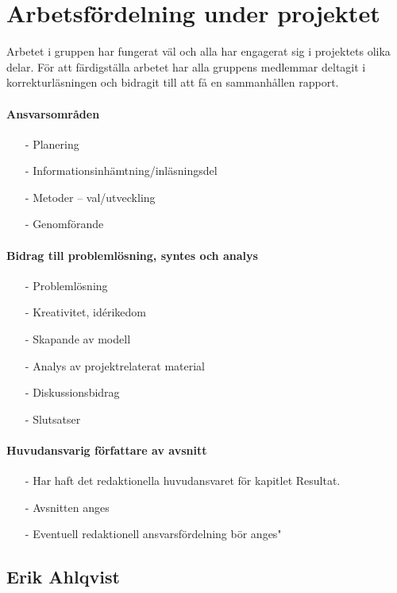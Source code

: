 \documentclass[12pt,a4paper]{article}
\begin{document}

\section*{Arbetsfördelning under projektet}

Arbetet i gruppen har fungerat väl och alla har engagerat sig i projektets olika delar. För att färdigställa arbetet har alla gruppens medlemmar deltagit i korrekturläsningen och bidragit till att få en sammanhållen rapport.

\paragraph{Ansvarsområden}
\begin{itemize}
\item[-]Planering
\item[-]Informationsinhämtning/inläsningsdel
\item[-]Metoder -- val/utveckling 
\item[-]Genomförande 
\end{itemize}
\paragraph{Bidrag till problemlösning, syntes och analys}
\begin{itemize}
\item[-]Problemlösning 
\item[-]Kreativitet, idérikedom
\item[-]Skapande av modell
\item[-]Analys av projektrelaterat material 
\item[-]Diskussionsbidrag
\item[-]Slutsatser 
\end{itemize}
\paragraph{Huvudansvarig författare av avsnitt}
\begin{itemize}
\item[-] Har haft det redaktionella huvudansvaret för kapitlet Resultat.
\item[-]Avsnitten anges
\item[-]Eventuell redaktionell ansvarsfördelning bör anges"
\end{itemize}


\subsection*{Erik Ahlqvist}
\end{document}
